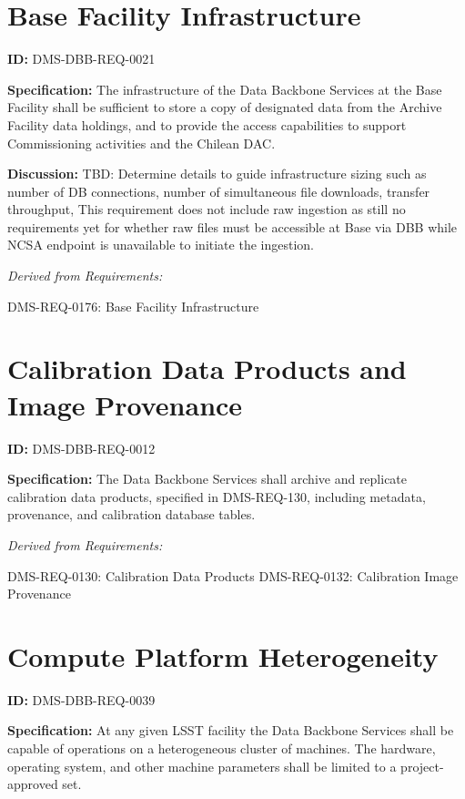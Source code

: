 \documentclass[SE,toc,lsstdraft]{lsstdoc}
\begin{document}
\section{Base Facility Infrastructure}

\label{DMS-DBB-REQ-0021}
\textbf{ID:} DMS-DBB-REQ-0021

\textbf{Specification:}
The infrastructure of the Data Backbone Services at the Base Facility shall be sufficient to store a copy of designated data from the Archive Facility data holdings, and to provide the access capabilities to support Commissioning activities and the Chilean DAC.

\textbf{Discussion:}
TBD:  Determine details to guide infrastructure sizing such as number of DB connections, number of simultaneous file downloads, transfer throughput,    This requirement does not include raw ingestion as still no requirements yet for whether raw files must be accessible at Base via DBB while NCSA endpoint is unavailable to initiate the ingestion.

\emph{Derived from Requirements:}

DMS-REQ-0176:
Base Facility Infrastructure \newline

\section{Calibration Data Products and Image Provenance}

\label{DMS-DBB-REQ-0012}
\textbf{ID:} DMS-DBB-REQ-0012

\textbf{Specification:}
The Data Backbone Services shall archive and replicate calibration data products, specified in DMS-REQ-130, including metadata, provenance, and calibration database tables.

\emph{Derived from Requirements:}

DMS-REQ-0130:
Calibration Data Products \newline
DMS-REQ-0132:
Calibration Image Provenance \newline

\section{Compute Platform Heterogeneity}

\label{DMS-DBB-REQ-0039}
\textbf{ID:} DMS-DBB-REQ-0039

\textbf{Specification:}
At any given LSST facility the Data Backbone Services shall be capable of operations on a heterogeneous cluster of machines. The hardware, operating system, and other machine parameters shall be limited to a project-approved set.
\end{document}
